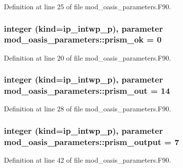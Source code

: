 Definition at line 25 of file mod\+\_\+oasis\+\_\+parameters.\+F90.

\hypertarget{classmod__oasis__parameters_aa7cbeb1a099f571702827ace878cdc64}{
\subsubsection[{prism\+\_\+ok}]{\setlength{\rightskip}{0pt plus 5cm}integer (kind=ip\+\_\+intwp\+\_\+p), parameter mod\+\_\+oasis\+\_\+parameters\+::prism\+\_\+ok = 0}}\label{classmod__oasis__parameters_aa7cbeb1a099f571702827ace878cdc64}


Definition at line 20 of file mod\+\_\+oasis\+\_\+parameters.\+F90.

\hypertarget{classmod__oasis__parameters_a58d4e90d13e758e6a6dfab01e6a1415e}{
\subsubsection[{prism\+\_\+out}]{\setlength{\rightskip}{0pt plus 5cm}integer (kind=ip\+\_\+intwp\+\_\+p), parameter mod\+\_\+oasis\+\_\+parameters\+::prism\+\_\+out = 14}}\label{classmod__oasis__parameters_a58d4e90d13e758e6a6dfab01e6a1415e}


Definition at line 28 of file mod\+\_\+oasis\+\_\+parameters.\+F90.

\hypertarget{classmod__oasis__parameters_adc510873316710fd71696fabcc34f336}{
\subsubsection[{prism\+\_\+output}]{\setlength{\rightskip}{0pt plus 5cm}integer (kind=ip\+\_\+intwp\+\_\+p), parameter mod\+\_\+oasis\+\_\+parameters\+::prism\+\_\+output = 7}}\label{classmod__oasis__parameters_adc510873316710fd71696fabcc34f336}


Definition at line 42 of file mod\+\_\+oasis\+\_\+parameters.\+F90.

